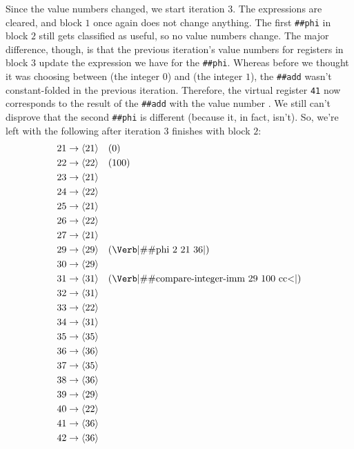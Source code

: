 Since the value numbers changed, we start iteration $3$.  The expressions are
cleared, and block $1$ once again does not change anything.  The first
\Verb|##phi| in block $2$ still gets classified as useful, so no value
numbers change.  The major difference, though, is that the previous iteration's
value numbers for registers in block $3$ update the expression we have for the
\Verb|##phi|.  Whereas before we thought it was choosing between  (the
integer $0$) and  (the integer $1$), the \Verb|##add| wasn't
constant-folded in the previous iteration.  Therefore, the virtual register
\Verb|41| now corresponds to the result of the \Verb|##add| with the value
number .  We still can't disprove that the second \Verb|##phi| is
different (because it, in fact, isn't).  So, we're left with the following
after iteration $3$ finishes with block $2$:
%
\begin{align*}
  21 &\to \vn{21} \quad (0)                                                \\
  22 &\to \vn{22} \quad (100)                                              \\
  23 &\to \vn{21}                                                          \\
  24 &\to \vn{22}                                                          \\
  25 &\to \vn{21}                                                          \\
  26 &\to \vn{22}                                                          \\
  27 &\to \vn{21}                                                          \\
  29 &\to \vn{29} \quad (\text{\Verb|\#\#phi 2 21 36|})                    \\
  30 &\to \vn{29}                                                          \\
  31 &\to \vn{31} \quad (\text{\Verb|\#\#compare-integer-imm 29 100 cc<|}) \\
  32 &\to \vn{31}                                                          \\
  33 &\to \vn{22}                                                          \\
  34 &\to \vn{31}                                                          \\
  35 &\to \vn{35}                                                          \\
  36 &\to \vn{36}                                                          \\
  37 &\to \vn{35}                                                          \\
  38 &\to \vn{36}                                                          \\
  39 &\to \vn{29}                                                          \\
  40 &\to \vn{22}                                                          \\
  41 &\to \vn{36}                                                          \\
  42 &\to \vn{36}
\end{align*}

